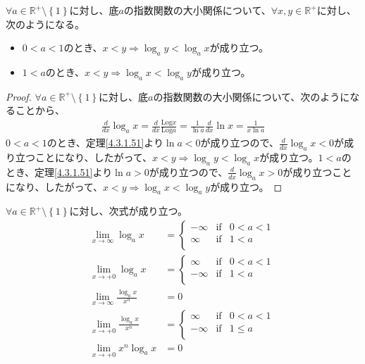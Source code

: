 \documentclass[dvipdfmx]{jsarticle}
\begin{document}
\begin{thm}\label{4.3.3.21}
$\forall a \in \mathbb{R}^{+} \setminus \left\{ 1 \right\}$に対し、底$a$の指数関数の大小関係について、$\forall x,y \in \mathbb{R}^{+}$に対し、次のようになる。
\begin{itemize}
\item
  $0 < a < 1$のとき、$x < y \Rightarrow \log_{a}y < \log_{a}x$が成り立つ。
\item
  $1 < a$のとき、$x < y \Rightarrow \log_{a}x < \log_{a}y$が成り立つ。
\end{itemize}
\end{thm}
\begin{proof}
$\forall a \in \mathbb{R}^{+} \setminus \left\{ 1 \right\}$に対し、底$a$の指数関数の大小関係について、次のようになることから、
\begin{align*}
\frac{d}{dx}\log_{a}x = \frac{d}{dx}\frac{\mathrm{Log}x}{\mathrm{Log}a} = \frac{1}{\ln a}\frac{d}{dx}\ln x = \frac{1}{x\ln a}
\end{align*}
$0 < a < 1$のとき、定理\ref{4.3.1.51}より$\ln a < 0$が成り立つので、$\frac{d}{dx}\log_{a}x < 0$が成り立つことになり、したがって、$x < y \Rightarrow \log_{a}y < \log_{a}x$が成り立つ。$1 < a$のとき、定理\ref{4.3.1.51}より$\ln a > 0$が成り立つので、$\frac{d}{dx}\log_{a}x > 0$が成り立つことになり、したがって、$x < y \Rightarrow \log_{a}x < \log_{a}y$が成り立つ。
\end{proof}
\begin{thm}\label{4.3.3.22}
$\forall a \in \mathbb{R}^{+} \setminus \left\{ 1 \right\}$に対し、次式が成り立つ。
\begin{align*}
\lim_{x \rightarrow \infty}{\log_{a}x} &= \left\{ \begin{matrix}
 - \infty & \mathrm{if} & 0 < a < 1 \\
\infty & \mathrm{if} & 1 < a \\
\end{matrix} \right.\ \\
\lim_{x \rightarrow + 0}{\log_{a}x} &= \left\{ \begin{matrix}
\infty & \mathrm{if} & 0 < a < 1 \\
 - \infty & \mathrm{if} & 1 < a \\
\end{matrix} \right.\ \\
\lim_{x \rightarrow \infty}\frac{\log_{a}x}{x^{n}} &= 0\\
\lim_{x \rightarrow + 0}\frac{\log_{a}x}{x^{n}} &= \left\{ \begin{matrix}
\infty & \mathrm{if} & 0 < a < 1 \\
 - \infty & \mathrm{if} & 1 \leq a \\
\end{matrix} \right.\ \\
\lim_{x \rightarrow + 0}{x^{n}\log_{a}x} &= 0
\end{align*}
\end{thm}
\end{document}
